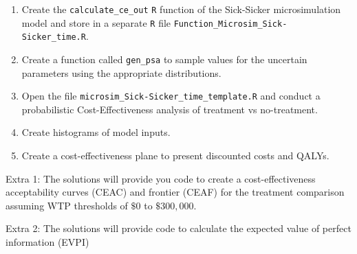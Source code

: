 \documentclass[
]{article}
\begin{document}
\begin{enumerate}
\def\labelenumi{\arabic{enumi}.}
\setcounter{enumi}{5}
\item
  Create the \texttt{calculate\_ce\_out} \texttt{R} function of the
  Sick-Sicker microsimulation model and store in a separate \texttt{R}
  file \texttt{Function\_Microsim\_Sick-Sicker\_time.R}.
\item
  Create a function called \texttt{gen\_psa} to sample values for the
  uncertain parameters using the appropriate distributions.
\item
  Open the file \texttt{microsim\_Sick-Sicker\_time\_template.R} and
  conduct a probabilistic Cost-Effectiveness analysis of treatment vs
  no-treatment.
\item
  Create histograms of model inputs.
\item
  Create a cost-effectiveness plane to present discounted costs and
  QALYs.
\end{enumerate}

Extra 1: The solutions will provide you code to create a
cost-effectiveness acceptability curves (CEAC) and frontier (CEAF) for
the treatment comparison assuming WTP thresholds of \(\$0\) to
\(\$300,000\).

Extra 2: The solutions will provide code to calculate the expected value
of perfect information (EVPI)
\end{document}
